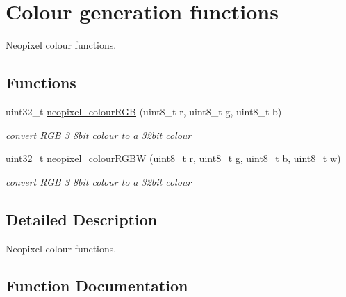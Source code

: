 \hypertarget{group___neo_pixel___colour}{}\section{Colour generation functions}
\label{group___neo_pixel___colour}


Neopixel colour functions.  


\subsection*{Functions}
\begin{DoxyCompactItemize}
\item 
uint32\+\_\+t \hyperlink{group___neo_pixel___colour_ga1d500fbcbecad76feef8835437687ca0}{neopixel\+\_\+colour\+R\+GB} (uint8\+\_\+t r, uint8\+\_\+t g, uint8\+\_\+t b)
\begin{DoxyCompactList}\small\item\em convert R\+GB 3 8bit colour to a 32bit colour \end{DoxyCompactList}\item 
uint32\+\_\+t \hyperlink{group___neo_pixel___colour_ga527ba03b45a249e5e1ea1da4b971b3ac}{neopixel\+\_\+colour\+R\+G\+BW} (uint8\+\_\+t r, uint8\+\_\+t g, uint8\+\_\+t b, uint8\+\_\+t w)
\begin{DoxyCompactList}\small\item\em convert R\+GB 3 8bit colour to a 32bit colour \end{DoxyCompactList}\end{DoxyCompactItemize}


\subsection{Detailed Description}
Neopixel colour functions. 



\subsection{Function Documentation}
\mbox{\label{group___neo_pixel___colour_ga1d500fbcbecad76feef8835437687ca0}} 

